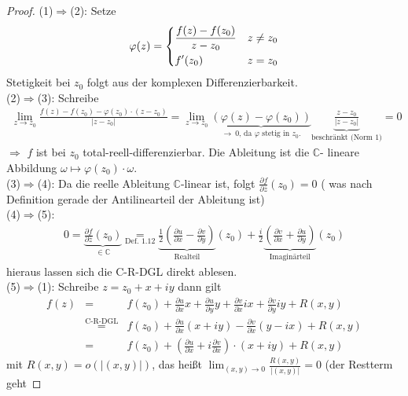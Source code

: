 \documentclass[11pt,titlepage]{article}
\theoremstyle{definition}
\theoremstyle{remark}
\begin{document}
	\begin{proof}
		(1)$\Rightarrow$(2): Setze 
		\[ \varphi(z)=\begin{dcases} \frac{f(z)-f(z_0)}{z-z_0} & z\neq z_0 \\ f'(z_0) & z=z_0 \end{dcases}\]
		Stetigkeit bei $z_0$ folgt aus der komplexen Differenzierbarkeit.\\
		(2)$\Rightarrow$(3): Schreibe
		\begin{eqnarray*}
			\lim_{z\to z_0} \frac{f(z)-f(z_0)-\varphi(z_0)\cdot (z-z_0)}{|z-z_0|} = 
			\lim_{z\to z_0} \underbrace{(\varphi(z)-\varphi(z_0))}_{\to \ 0\text{, da $\varphi$ stetig in 
			$z_0$.}} \underbrace{\frac{z-z_0}{|z-z_0|}}_{\text{beschränkt (Norm $1$)}} =0
		\end{eqnarray*}
		$\Rightarrow$ $f$ ist bei $z_0$ total-reell-differenzierbar. Die Ableitung ist die $\mathbb{C}$-
		lineare Abbildung $\omega\mapsto \varphi(z_0)\cdot \omega$.\\
		(3)$\Rightarrow$(4): Da die reelle Ableitung $\mathbb{C}$-linear ist, folgt 
		$\frac{\partial f}{\partial \overline{z}}(z_0)=0$ ( was nach Definition gerade der Antilinearteil 
		der Ableitung ist)\\
		(4)$\Rightarrow$(5):
		\begin{eqnarray*}
			0=\underbrace{\frac{\partial f}{\partial \overline{z}}(z_0)}_{\in \mathbb{C}} \underset{\text{
			Def. 1.12}}{=} \underbrace{\frac{1}{2} \left( \frac{\partial u}{\partial x} -
			\frac{\partial v}{\partial y} \right)}_{\text{Realteil}}(z_0) + \frac{i}{2} \underbrace{
			\left( \frac{\partial v}{\partial x}+\frac{\partial u}{\partial y}\right)}_{\text{Imaginärteil}}(z_0)
		\end{eqnarray*}
		hieraus lassen sich die C-R-DGL direkt ablesen.\\
		(5)$\Rightarrow$(1): Schreibe $z=z_0 +x+iy$ dann gilt
		\begin{eqnarray*}
			f(z) &=& f(z_0) +\frac{\partial u}{\partial x} x +\frac{\partial u}{\partial y} y +
			 \frac{\partial v}{\partial x} ix + \frac{\partial v}{\partial y} iy +R(x,y) \\
			&\overset{\text{C-R-DGL}}{=}& f(z_0) +\frac{\partial u}{\partial x} (x+iy) -\frac{\partial v}
			{\partial x}(y-ix)+R(x,y) \\
			&=& f(z_0) +\left(\frac{\partial u}{\partial x}+i \frac{\partial v}{\partial x}\right)\cdot
			(x+iy)+R(x,y)
		\end{eqnarray*}
		mit $R(x,y)=o(|(x,y)|)$, das heißt $\lim_{(x,y)\to 0} \frac{R(x,y)}{|(x,y)|}=0$ (der Restterm geht 

\end{proof}
\end{document}
